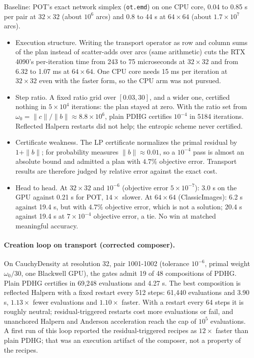  Baseline: POT's exact
network simplex (\texttt{ot.emd}) on one CPU core, 0.04 to 0.85 s per pair at
$32\times32$ (about $10^6$ arcs) and 0.8 to 44 s at $64\times64$ (about
$1.7\times10^7$ arcs).

\begin{itemize}
\item Execution structure. Writing the transport operator as row and column
 sums of the plan instead of scatter-adds over arcs (same arithmetic)
 cuts the RTX 4090's per-iteration time from 243 to 75 microseconds at
 $32\times32$ and from 6.32 to 1.07 ms at $64\times64$. One CPU core needs
 15 ms per iteration at $32\times32$ even with the faster form, so the CPU
 arm was not pursued.
\item Step ratio. A fixed ratio grid over $[0.03, 30]$, and a wider one, certified
 nothing in $5\times10^4$ iterations: the plan stayed at zero. With the ratio
 set from $\omega_0 = \|c\|/\|b\| \approx 8.8\times10^6$, plain PDHG certifies
 $10^{-4}$ in 5184 iterations. Reflected Halpern restarts did not help; the
 entropic scheme never certified.
\item Certificate weakness. The LP certificate normalizes the primal residual
 by $1+\|b\|$; for probability measures $\|b\|\approx0.01$, so a $10^{-4}$
 pass is almost an absolute bound and admitted a plan with $4.7\%$
 objective error. Transport results are therefore judged by relative error
 against the exact cost.
\item Head to head. At $32\times32$ and $10^{-6}$ (objective error
 $5\times10^{-7}$): 3.0 s on the GPU against 0.21 s for POT, $14\times$
 slower. At $64\times64$ (ClassicImages): 6.2 s against 19.4 s, but with
 $4.7\%$ objective error, which is not a solution; 20.4 s against 19.4 s at
 $7\times10^{-4}$ objective error, a tie. No win at matched meaningful
 accuracy.
\end{itemize}

\paragraph{Creation loop on transport (corrected composer).}
On CauchyDensity at resolution 32, pair 1001-1002 (tolerance $10^{-6}$, primal
weight $\omega_0/30$, one Blackwell GPU), the gates admit 19 of 48 compositions
of PDHG. Plain PDHG certifies in 69,248 evaluations and 4.27 s. The best
composition is reflected Halpern with a fixed restart every 512 steps: 61,440
evaluations and 3.90 s, $1.13\times$ fewer evaluations and $1.10\times$ faster.
With a restart every 64 steps it is roughly neutral; residual-triggered restarts
cost more evaluations or fail, and unanchored Halpern and Anderson acceleration
reach the cap of $10^5$ evaluations. A first run of this loop reported the
residual-triggered recipes as $12\times$ faster than plain PDHG; that was an
execution artifact of the composer, not a
property of the recipes.


